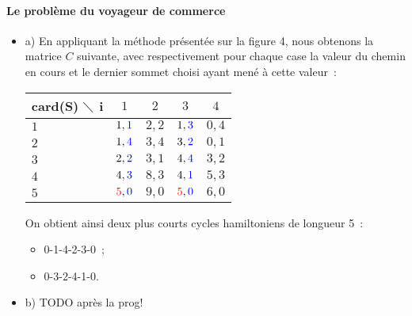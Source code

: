 \paragraph{Le problème du voyageur de commerce}

\begin{itemize}
\item a) En appliquant la méthode présentée sur la figure 4, nous
obtenons la matrice $C$ suivante, avec respectivement pour chaque case la valeur du
chemin en cours et le dernier sommet choisi ayant mené à cette valeur~:
\begin{center}
\begin{tabular}{|l|c|c|c|c|}
\hline  card(S) $\diagdown$ i  & $1$ & $2$ & $3$ & $4$ \\
\hline $1$ & $1,\textcolor{blue}{1}$ & $2,2$ & $1,\textcolor{blue}{3}$ & $0,4$ \\
\hline $2$ & $1,\textcolor{blue}{4}$ & $3,4$ & $3,\textcolor{blue}{2}$ & $0,1$  \\
\hline $3$ & $2,\textcolor{blue}{2}$ & $3,1$ & $4,\textcolor{blue}{4}$ & $3,2$ \\
\hline $4$ & $4,\textcolor{blue}{3}$ & $8,3$ & $4,\textcolor{blue}{1}$ & $5,3$ \\
\hline $5$ & $\textcolor{red}{5},\textcolor{blue}{0}$ & $9,0$ & $\textcolor{red}{5},\textcolor{blue}{0}$ & $6,0$ \\
\hline
\end{tabular}
\end{center}
\vspace{1cm}
On obtient ainsi deux plus courts cycles hamiltoniens de longueur 5~:
\begin{itemize}
\item 0-1-4-2-3-0~;
\item 0-3-2-4-1-0.
\end{itemize}
\item b) TODO après la prog!
\end{itemize}
